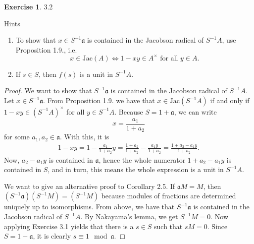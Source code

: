 \documentclass{book}
\theoremstyle{plain}
\theoremstyle{definition}
\newtheorem{exr}[thm]{Exercise}
\theoremstyle{custom_definition}
\begin{document}
\begin{exr}
    3.2

    Hints
    \begin{enumerate}
        \item To show that \(x \in S^{-1}\mathfrak{a}\) is contained in the Jacobson radical of \(S^{-1}A\), use Proposition 1.9., i.e.
        \begin{equation}
            x \in \mathrm{Jac}(A) \iff 1 - xy \in A^\times \text{ for all } y \in A \text{.}
        \end{equation}
        \item If \(s \in S\), then \(f(s)\) is a unit in \(S^{-1}A\).
    \end{enumerate}
\end{exr}
\begin{proof}
    We want to show that \(S^{-1} \mathfrak{a}\) is contained in the Jacobson radical of \(S^{-1} A\). Let \(x \in S^{-1}\mathfrak{a}\). From Proposition 1.9. we have that \(x \in \mathrm{Jac}(S^{-1} A)\) if and only if \(1 - xy \in (S^{-1}A)^\times\) for all \(y \in S^{-1}A\). Because \(S = 1 + \mathfrak{a}\), we can write
    \begin{equation}
        x = \frac{a_1}{1 + a_2}
    \end{equation}
    for some \(a_1, a_2 \in \mathfrak{a}\). With this, it is
    \begin{align}
        1 - xy = 1 - \frac{a_1}{1 + a_2} y = \frac{1 + a_2}{1 + a_2} - \frac{a_1 y}{1 + a_2} = \frac{1 + a_2 - a_1 y}{1 + a_2} \text{.}
    \end{align}
    Now, \(a_2 - a_1 y\) is contained in \(\mathfrak{a}\), hence the whole numerator \(1 + a_2 - a_1 y\) is contained in \(S\), and in turn, this means the whole expression is a unit in \(S^{-1}A\).

    We want to give an alternative proof to Corollary 2.5. If \(\mathfrak{a}M = M\), then \((S^{-1} \mathfrak{a}) (S^{-1} M) = (S^{-1}M)\) because modules of fractions are determined uniquely up to isomorphisms. From above, we have that \(S^{-1}\mathfrak{a}\) is contained in the Jacobson radical of \(S^{-1}A\). By Nakayama's lemma, we get \(S^{-1}M = 0\). Now applying Exercise 3.1 yields that there is a \(s \in S\) such that \(sM = 0\). Since \(S = 1 + \mathfrak{a}\), it is clearly \(s \equiv 1 \mod{\mathfrak{a}}\).
\end{proof}
\end{document}
